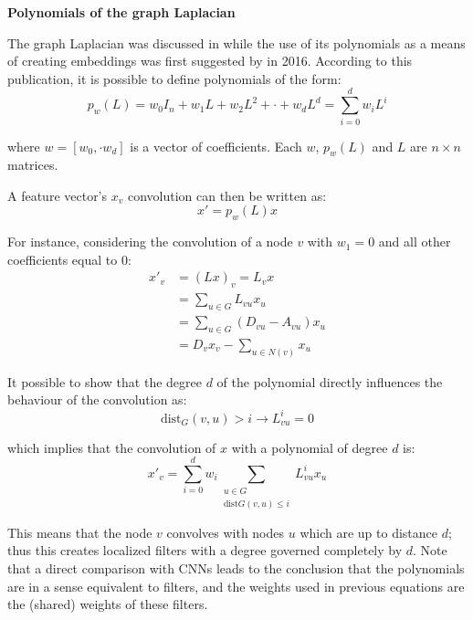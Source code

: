 \textbf{Polynomials of the graph Laplacian}


The graph Laplacian was discussed in  while the use of its
polynomials as a means of creating embeddings was first suggested
by \citet{defferrard2016convolutional} in 2016. According to this
publication, it is possible to define polynomials of the form:
\begin{equation}
  \label{eq:polynomial_basic}
  p_w(L) = w_0 I_n + w_1L + w_2L^2 + \cdot + w_dL^d = \sum_{i=0}^dw_iL^i
\end{equation}

where $w = [w_0, \cdot w_d]$ is a vector of coefficients. Each $w$,
$p_w(L)$ and $L$ are $n\times n $ matrices.

A feature vector's $x_v$  convolution can then be written as:
\begin{equation}
  \label{eq:convo_pol}
  x' = p_w(L) x 
\end{equation}

For instance, considering the convolution of a node $v$
with $w_1 = 0$ and all other coefficients equal to 0:
\begin{equation}
  \begin{split}
  x'_v &= (Lx)_v = L_v x \\
 &= \sum_{u \in G}L_{vu}x_u \\
 &= \sum_{u \in G}(D_{vu} - A_{vu})x_u \\
 &= D_vx_v - \sum_{u\in N(v)} x_u
  \end{split}
  \label{eq:conv_ex}
\end{equation}

It possible to show \cite[Lemma ~5.2]{article:hammond} that the
degree $d$ of the polynomial directly influences the behaviour of the
convolution as:
\begin{equation}
  \label{eq:poly_deg}
  \text{dist}_G(v,u)>i \rightarrow L^i_{vu} = 0
\end{equation}

which implies that the convolution of $x$ with a
polynomial of degree $d$ is:
\begin{equation}
  \label{eq:poly_fin}
  x'_v = \sum_{i=0}^dw_i \sum_{\substack{u \in G \\ \text{dist}G(v,u) \leq i}} L^i_{vu}x_u
\end{equation}

This means that the node $v$ convolves with nodes $u$ which are up to distance $d$; thus
this creates localized filters with a degree governed completely by $d$. Note that a
direct comparison with CNNs leads to the conclusion that the polynomials are in a sense
equivalent to filters, and the weights used in previous equations are the (shared) weights
of these filters.

